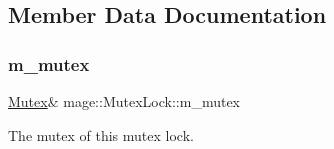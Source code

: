 \subsection{Member Data Documentation}
\hypertarget{structmage_1_1_mutex_lock_a1c796e1e66bd49007fe746d1425b82f4}{}\label{structmage_1_1_mutex_lock_a1c796e1e66bd49007fe746d1425b82f4} 
\subsubsection{\texorpdfstring{m\+\_\+mutex}{m\_mutex}}
{\footnotesize\ttfamily \hyperlink{classmage_1_1_mutex}{Mutex}\& mage\+::\+Mutex\+Lock\+::m\+\_\+mutex\hspace{0.3cm}{\ttfamily [private]}}

The mutex of this mutex lock. 